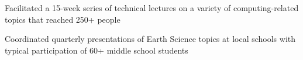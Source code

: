 \documentclass[letterpaper]{deedy-resume} %
\begin{document}
\begin{minipage}[t]{0.66\textwidth}


\begin{tightitemize}
\item Facilitated a 15-week series of technical lectures on a variety of computing-related topics that reached 250+ people
\end{tightitemize}

\sectionspace %

%
%
%
%



\begin{tightitemize}
\item Coordinated quarterly presentations of Earth Science topics at local schools with typical participation of 60+ middle school students
\end{tightitemize}

\end{minipage} %

\end{document}
